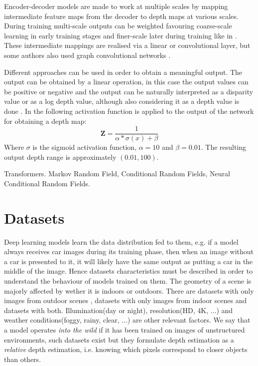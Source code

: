 Encoder-decoder models are made to work at multiple scales by mapping intermediate feature maps from the decoder to depth maps at various scales.
During training multi-scale outputs can be weighted favouring coarse-scale learning in early training stages and finer-scale later during training like in \cite{DispNet}.
These intermediate mappings are realised via a linear or convolutional layer, but some authors also used graph convolutional networks \cite{GCNDepth}.


Different approaches can be used in order to obtain a meaningful output.
The output can be obtained by a linear operation, in this case the output values can be positive or negative and the output can be naturally interpreted as a disparity value or as a log depth value, although also considering it as a depth value is done \cite{Eigen}.
In \cite{SfMLearner} the following activation function is applied to the output of the network for obtaining a depth map:
\[
	\mathbf{Z} = \frac{1}{\alpha * \sigma(x) + \beta}
\]
Where $\sigma$ is the sigmoid activation function, $\alpha=10$ and $\beta=0.01$.
The resulting output depth range is approximately $(0.01, 100)$.

Transformers.
Markov Random Field, Conditional Random Fields, Neural Conditional Random Fields.

\section{Datasets}
Deep learning models learn the data distribution fed to them, e.g. if a model always receives car images during its training phase, then when an image without a car is presented to it, it will likely have the same output as putting a car in the middle of the image.
Hence datasets characteristics must be described in order to understand the behaviour of models trained on them.
The geometry of a scene is majorly affected by wether it is indoors or outdoors.
There are datasets with only images from outdoor scenes \cite{KITTI} \cite{Cityscapes}, datasets with only images from indoor scenes \cite{NYUv2} and datasets with both.
Illumination(day or night), resolution(HD, 4K, ...) and weather conditions(foggy, rainy, clear, ...) are other relevant factors.
We say that a model operates \textit{into the wild} if it has been trained on images of unstructured environments, such datasets exist \cite{DIW} \cite{ReDWeb} \cite{Youtube3D} but they formulate depth estimation as a \textit{relative} depth estimation, i.e. knowing which pixels correspond to closer objects than others.

